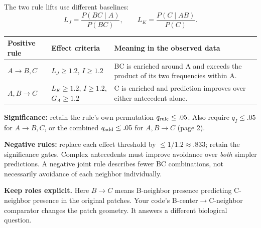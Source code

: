 \documentclass[10pt,a4paper]{article}
\newcommand{\heading}[1]{\par\vspace{5pt}{\large\bfseries\color{ink}#1}\par\vspace{2pt}}
\newcommand{\note}[1]{\par\noindent\colorbox{pale}{\parbox{\dimexpr\linewidth-2\fboxsep\relax}{#1}}\par}
\begin{document}
\begin{center}
\end{center}
\vspace{-3mm}

\heading{2\quad Recommended gates}
The two rule lifts use different baselines:
\[
 L_J=\frac{P(BC\mid A)}{P(BC)},\qquad
 L_K=\frac{P(C\mid AB)}{P(C)}.
\]
\begin{tabularx}{\linewidth}{@{}p{23mm}YY@{}}
\toprule
\textbf{Positive rule}&\textbf{Effect criteria}&\textbf{Meaning in the observed data}\\
\midrule
$A\to B,C$ & $L_J\ge1.2$, $I\ge1.2$ & BC is enriched around A and exceeds the product of its two frequencies within A.\\
$A,B\to C$ & $L_K\ge1.2$, $I\ge1.2$, $G_A\ge1.2$ & C is enriched and prediction improves over either antecedent alone.\\
\bottomrule
\end{tabularx}

\textbf{Significance:} retain the rule's own permutation $q_{\rm rule}\le.05$. Also require $q_I\le.05$ for $A\to B,C$, or the combined $q_{\rm add}\le.05$ for $A,B\to C$ (page 2).

\textbf{Negative rules:} replace each effect threshold by $\le1/1.2\approx.833$; retain the significance gates. Complex antecedents must improve avoidance over \emph{both} simpler predictions. A negative joint rule describes fewer BC combinations, not necessarily avoidance of each neighbor individually.

\note{\textbf{Keep roles explicit.} Here $B\to C$ means B-neighbor presence predicting C-neighbor presence in the original patches. Your code's B-center$\to$C-neighbor comparator changes the patch geometry. It answers a different biological question.}
\end{document}
